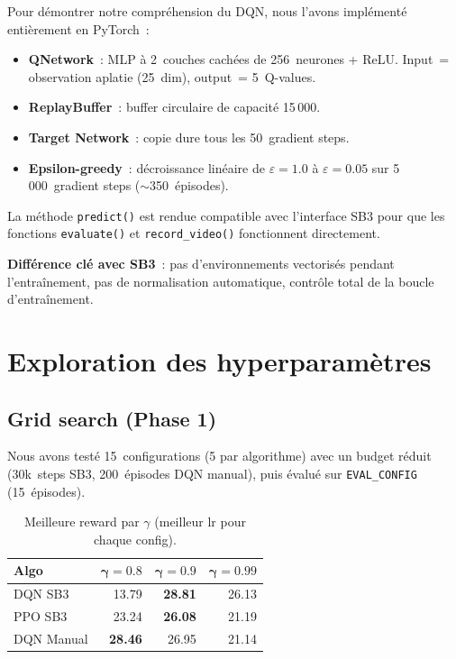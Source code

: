 \documentclass[11pt, a4paper]{article}
\begin{document}
Pour démontrer notre compréhension du DQN, nous l'avons implémenté entièrement en PyTorch~:

\begin{itemize}[nosep]
    \item \textbf{QNetwork}~: MLP à 2~couches cachées de 256~neurones + ReLU. Input~= observation aplatie (25~dim), output~= 5~Q-values.
    \item \textbf{ReplayBuffer}~: buffer circulaire de capacité 15\,000.
    \item \textbf{Target Network}~: copie dure tous les 50~gradient steps.
    \item \textbf{Epsilon-greedy}~: décroissance linéaire de $\varepsilon=1.0$ à $\varepsilon=0.05$ sur 5\,000~gradient steps ($\sim$350~épisodes).
\end{itemize}

La méthode \texttt{predict()} est rendue compatible avec l'interface SB3 pour que les fonctions \texttt{evaluate()} et \texttt{record\_video()} fonctionnent directement.

\textbf{Différence clé avec SB3}~: pas d'environnements vectorisés pendant l'entraînement, pas de normalisation automatique, contrôle total de la boucle d'entraînement.

\section{Exploration des hyperparamètres}

\subsection{Grid search (Phase 1)}

Nous avons testé 15~configurations (5 par algorithme) avec un budget réduit (30k~steps SB3, 200~épisodes DQN manual), puis évalué sur \texttt{EVAL\_CONFIG} (15~épisodes).

\begin{table}[H]
\centering
\begin{tabular}{l rrr}
\toprule
\textbf{Algo} & $\boldsymbol{\gamma=0.8}$ & $\boldsymbol{\gamma=0.9}$ & $\boldsymbol{\gamma=0.99}$\\
\midrule
DQN SB3        & 13.79 & \textbf{28.81} & 26.13 \\
PPO SB3        & 23.24 & \textbf{26.08} & 21.19 \\
DQN Manual     & \textbf{28.46} & 26.95 & 21.14 \\
\bottomrule
\end{tabular}
\caption{Meilleure reward par $\gamma$ (meilleur lr pour chaque config).}
\label{tab:gridsearch}
\end{table}
\end{document}
